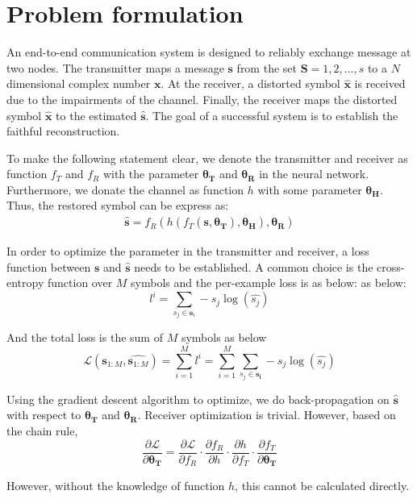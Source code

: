 \documentclass[12pt,a4paper]{article}
\begin{document}
	\section{Problem formulation}
	\noindent
	\par  An end-to-end communication system is designed to reliably exchange message at two nodes. The transmitter maps a message $\bm{s}$ from the set $\mathbf{S}={1,2,...,s}$ to a $N$ dimensional complex number $\bm{x}$. At the receiver, a distorted symbol $\hat{\bm{x}}$ is received due to the impairments of the channel. Finally, the receiver maps the distorted symbol $\hat{\bm{x}}$ to the estimated $\hat{\bm{s}}$. The goal of a successful system is to establish the faithful reconstruction.
	\par To make the following statement clear, we denote the transmitter and receiver as function $f_T$ and $f_R$ with the parameter $\bm{\theta_T}$ and $\bm{\theta_R}$ in the neural network. Furthermore, we donate the channel as function $h$ with some parameter $\bm{\theta_H}$. Thus, the restored symbol can be express as:
	\begin{equation}
		\begin{aligned}
			\hat{\bm{s}}=f_R(h(f_T(\bm{s},\bm{\theta_T}),\bm{\theta_H}),\bm{\theta_R})
		\end{aligned}
	\end{equation}
	\par In order to optimize the parameter in the transmitter and receiver, a loss function between $\bm{s}$ and $\hat{\bm{s}}$ needs to be established. A common choice is the cross-entropy function over $M$ symbols and the per-example loss is as below: as below:
	\begin{equation}
		l^{i}=\sum_{s_j\in\bm{s}_i}-s_j\log(\hat{s_j})
	\end{equation}
	\par And the total loss is the sum of $M$ symbols as below
	\begin{equation} \label{loss}
		\mathcal{L}(\bm{s}_{1:M},\hat{\bm{s}_{1:M}})=\sum_{i=1}^{M}l^i=\sum_{i=1}^{M}\sum_{s_j\in\bm{s_i}}-s_j\log(\hat{s_j})
	\end{equation}
	 
	\par Using the gradient descent algorithm to optimize, we do back-propagation on $\hat{\bm{s}}$ with respect to $\bm{\theta_T}$ and $\bm{\theta_R}$. Receiver optimization is trivial. However, based on the chain rule,
	\begin{equation}
		\frac{\partial\mathcal{L}}{\partial\bm{\theta_T}}=\frac{\partial\mathcal{L}}{\partial f_R}\cdot\frac{\partial f_R}{\partial h}\cdot\frac{\partial h}{\partial f_T}\cdot\frac{\partial f_T}{\partial\bm{\theta_T}}
	\end{equation}
	\par However, without the knowledge of function $h$, this cannot be calculated directly.
\end{document}
